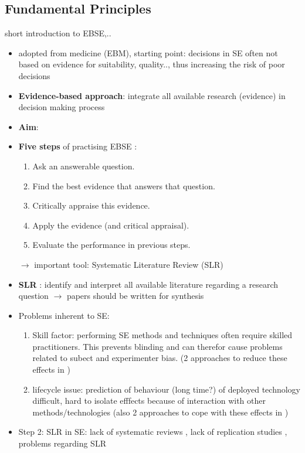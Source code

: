 \subsection{Fundamental Principles}

short introduction to EBSE,..

\begin{itemize}
	\item adopted from medicine (EBM), starting point: decisions in SE often not based on evidence for suitability, quality.., thus increasing the risk of poor decisions 
	\item \textbf{Evidence-based approach}: integrate all available research (evidence) in decision making process
	\item \textbf{Aim}:  \cite{EBSEpract}
	\item \textbf{Five steps} of practising EBSE \cite{EBSE}:
		\begin{enumerate}
			\item Ask an answerable question.
			\item Find the best evidence that answers that question.
			\item Critically appraise this evidence.
			\item Apply the evidence (and critical appraisal).
			\item Evaluate the performance in previous steps.
		\end{enumerate}
		$\rightarrow$ important tool: Systematic Literature Review (SLR)
	\item \textbf{SLR} \cite{keele2007}: identify and interpret all available literature regarding a research question
		$\rightarrow$ papers should be written for synthesis 
	\item Problems inherent to SE\cite{EBSE}:
		\begin{enumerate}
			\item Skill factor: performing SE methods and techniques often require skilled practitioners. This prevents blinding and can therefor cause problems related to subect and experimenter bias. (2 approaches to reduce these effects in \cite{EBSE})
			\item lifecycle issue: prediction of behaviour (long time?) of deployed technology difficult, hard to isolate efffects because of interaction with other methods/technologies (also 2 approaches to cope with these effects in \cite{EBSE})
		\end{enumerate}
		\item Step 2: SLR in SE: lack of systematic reviews , lack of replication studies , problems regarding SLR 
\end{itemize}